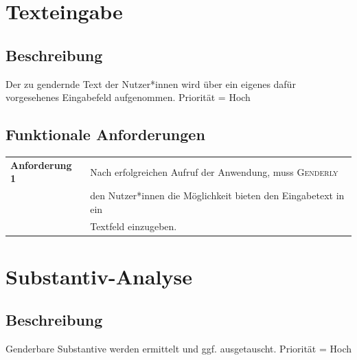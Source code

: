 \documentclass[paper=a4, parskip=half]{scrreprt}
\newcommand{\Genderly}{\textsc{Genderly}}
\begin{document}
\section{Texteingabe}
\subsection{Beschreibung}
Der zu gendernde Text der Nutzer*innen wird über ein eigenes dafür vorgesehenes Eingabefeld aufgenommen. Priorität = Hoch
\subsection{Funktionale Anforderungen}
\begin{table}[!htb]
\begin{tabular}{ll}
\textbf{Anforderung 1} & Nach erfolgreichen Aufruf der Anwendung, muss \Genderly{} \\
& den Nutzer*innen die Möglichkeit bieten den Eingabetext in ein \\
& Textfeld einzugeben. \vspace{0.15cm} \\
\end{tabular}
\end{table}

\section{Substantiv-Analyse}
\subsection{Beschreibung}
Genderbare Substantive werden ermittelt und ggf. ausgetauscht. Priorität = Hoch
\end{document}
